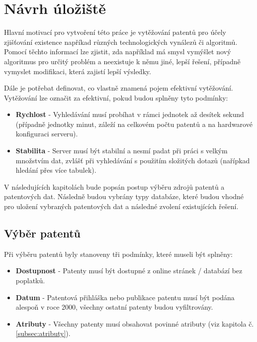 \chapter{Návrh úložiště}



\indent Hlavní motivací pro vytvoření této práce je vytěžování patentů pro účely zjišťování existence napříkad různých technologických vynálezů či algoritmů. Pomocí těchto informací lze zjistit, zda například má smysl vymýšlet nový algoritmus pro určitý problém a neexistuje k němu jiné, lepší řešení, případně vymyslet modifikaci, která zajistí lepší výsledky.
\newline

\noindent Dále je potřebat definovat, co vlastně znamená pojem efektivní vytěžování. Vytěžování lze označit za efektivní, pokud budou splněny tyto podmínky:
\begin{itemize}
\item \textbf{Rychlost} - Vyhledávání musí probíhat v rámci jednotek až desítek sekund (případně jednotky minut, záleží na celkovém počtu patentů a na hardwarové konfiguraci serveru).
\item \textbf{Stabilita} - Server musí být stabilní a nesmí padat při práci s velkým množstvím dat, zvlášť při vyhledávání s použitím složitých dotazů (nařípkad hledání přes více tabulek).
\end{itemize}

\noindent V následujících kapitolách bude popsán postup výběru zdrojů patentů a patentových dat. Následně budou vybrány typy databáze, které budou vhodné pro uložení vybraných patentových dat a následné zvolení existujících řešení.

\section{Výběr patentů}
Při výběru patentů byly stanoveny tři podmínky, které museli být splněny:
\begin{itemize}
\item \textbf{Dostupnost} - Patenty musí být dostupné z online stránek / databází bez poplatků.
\item \textbf{Datum} - Patentová přihláška nebo publikace patentu musí být podána alespoň v roce 2000, všechny ostatní patenty budou vyfiltrovány.
\item \textbf{Atributy} - Všechny patenty musí obsahovat povinné atributy (viz kapitola č. \ref{subsec:atributy}).
\end{itemize}

